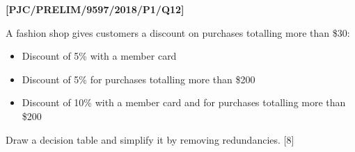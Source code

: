 \item \textbf{{[}PJC/PRELIM/9597/2018/P1/Q12{]} }

A fashion shop gives customers a discount on purchases totalling more
than \$30: 
\begin{itemize}
\item Discount of 5\% with a member card 
\item Discount of 5\% for purchases totalling more than \$200 
\item Discount of 10\% with a member card and for purchases totalling more
than \$200
\end{itemize}
Draw a decision table and simplify it by removing redundancies. \hfill{}
{[}8{]}
